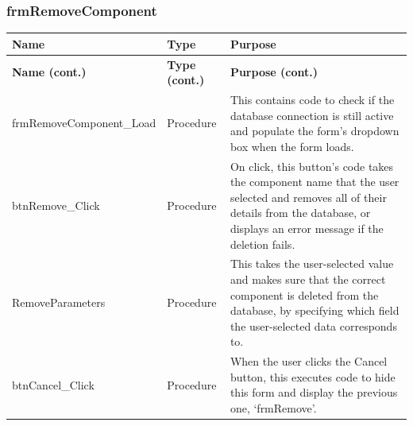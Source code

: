 	\subsubsection{frmRemoveComponent}
	\begin{longtable}{ | p{4cm} | p{3cm} | p{10cm} | }
		\hline
		\textbf{Name} & \textbf{Type} & \textbf{Purpose}\\
		\endfirsthead
		\hline
		\textbf{Name (cont.)} & \textbf{Type (cont.)} & \textbf{Purpose (cont.)}\\
		\endhead
		\hline
		frmRemoveComponent\_Load & Procedure & This contains code to check if the database connection is still active and populate the form's dropdown box when the form loads.\\
		\hline
		btnRemove\_Click & Procedure & On click, this button's code takes the component name that the user selected and removes all of their details from the database, or displays an error message if the deletion fails.\\
		\hline
		RemoveParameters & Procedure & This takes the user-selected value and makes sure that the correct component is deleted from the database, by specifying which field the user-selected data corresponds to.\\
		\hline
		btnCancel\_Click & Procedure & When the user clicks the Cancel button, this executes code to hide this form and display the previous one, `frmRemove'.\\
		\hline
	\end{longtable}
	
